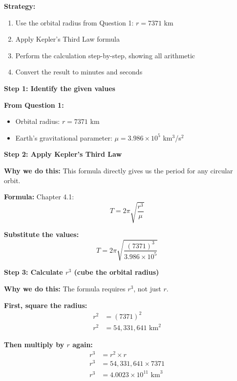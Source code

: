 \documentclass[11pt,letterpaper]{article}
\begin{document}
\textbf{Strategy:}
\begin{enumerate}
    \item Use the orbital radius from Question 1: $r = 7371$ km
    \item Apply Kepler's Third Law formula
    \item Perform the calculation step-by-step, showing all arithmetic
    \item Convert the result to minutes and seconds
\end{enumerate}

\vspace{0.3cm}

\textbf{Step 1: Identify the given values}

\textbf{From Question 1:}
\begin{itemize}
    \item Orbital radius: $r = 7371$ km
    \item Earth's gravitational parameter: $\mu = 3.986 \times 10^5$ km$^3$/s$^2$
\end{itemize}

\vspace{0.3cm}

\textbf{Step 2: Apply Kepler's Third Law}

\textbf{Why we do this:} This formula directly gives us the period for any circular orbit.

\textbf{Formula:} Chapter 4.1:
\begin{equation}
T = 2\pi \sqrt{\frac{r^3}{\mu}}
\end{equation}

\textbf{Substitute the values:}
\begin{equation}
T = 2\pi \sqrt{\frac{(7371)^3}{3.986 \times 10^5}}
\end{equation}

\vspace{0.3cm}

\textbf{Step 3: Calculate $r^3$ (cube the orbital radius)}

\textbf{Why we do this:} The formula requires $r^3$, not just $r$.

\textbf{First, square the radius:}
\begin{align}
r^2 &= (7371)^2 \\
r^2 &= 54,331,641 \text{ km}^2
\end{align}

\textbf{Then multiply by $r$ again:}
\begin{align}
r^3 &= r^2 \times r \\
r^3 &= 54,331,641 \times 7371 \\
r^3 &= 4.0023 \times 10^{11} \text{ km}^3
\end{align}
\end{document}
